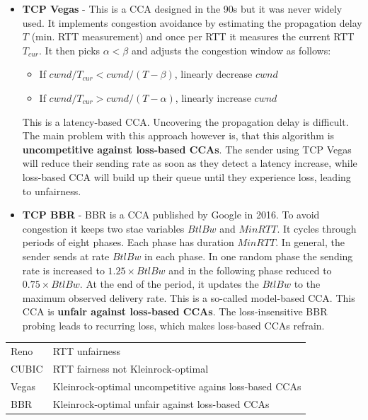 \begin{itemize}
\item \textbf{TCP Vegas} - This is a CCA designed in the 90s but it was never widely used. It implements congestion avoidance by estimating the propagation delay $T$ (min. RTT measurement) and once per RTT it measures the current RTT $T_{cur}$. It then picks $\alpha < \beta$ and adjusts the congestion window as follows:
\begin{itemize}
\item If $cwnd/T_{cur} < cwnd/(T - \beta)$, linearly decrease $cwnd$
\item If $cwnd/T_{cur} > cwnd/(T - \alpha)$, linearly increase $cwnd$
\end{itemize}
This is a latency-based CCA. Uncovering the propagation delay is difficult. The main problem with this approach however is, that this algorithm is \textbf{uncompetitive against loss-based CCAs}. The sender using TCP Vegas will reduce their sending rate as soon as they detect a latency increase, while loss-based CCA will build up their queue until they experience loss, leading to unfairness.
\item \textbf{TCP BBR} - BBR is a CCA published by Google in 2016. To avoid congestion it keeps two stae variables $BtlBw$ and $MinRTT$. It cycles through periods of eight phases. Each phase has duration $MinRTT$. In general, the sender sends at rate $BtlBw$ in each phase. In one random phase the sending rate is increased to $1.25 \times BtlBw$ and in the following phase reduced to $0.75 \times BtlBw$. At the end of the period, it updates the $BtlBw$ to the maximum observed delivery rate. This is a so-called model-based CCA. This CCA is \textbf{unfair against loss-based CCAs}. The loss-insensitive BBR probing leads to recurring loss, which makes loss-based CCAs refrain.
\end{itemize}
\begin{table}[H]
\centering
\begin{tabular}{p{2cm}p{8cm}}
\rule{0pt}{4ex} Reno & RTT unfairness \\
\rule{0pt}{4ex}  CUBIC & RTT fairness \newline not Kleinrock-optimal  \\
\rule{0pt}{4ex}  Vegas & Kleinrock-optimal \newline uncompetitive agains loss-based CCAs \\
\rule{0pt}{4ex}  BBR & Kleinrock-optimal \newline unfair against loss-based CCAs
\end{tabular}
\end{table}

